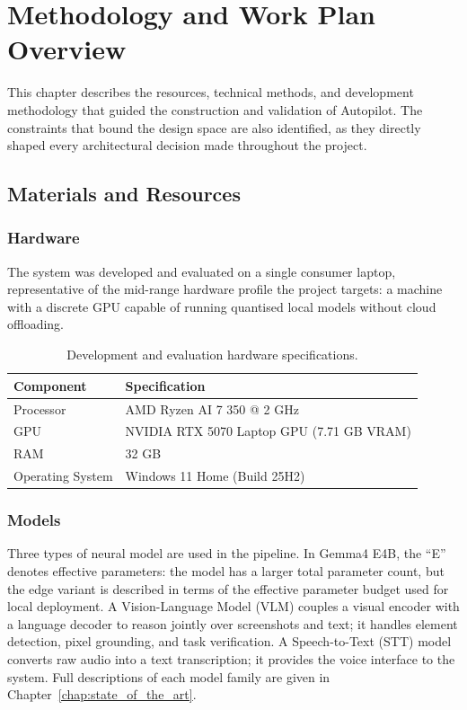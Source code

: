 ﻿\chapter{Methodology and Work Plan Overview}
\setcounter{section}{0}

This chapter describes the resources, technical methods, and development methodology that guided the construction and validation of Autopilot. The constraints that bound the design space are also identified, as they directly shaped every architectural decision made throughout the project.

\section{Materials and Resources}
\label{sec:materials_and_resources}

\subsection{Hardware}

The system was developed and evaluated on a single consumer laptop, representative of the mid-range hardware profile the project targets: a machine with a discrete GPU capable of running quantised local models without cloud offloading.

\begin{table}[H]
\centering
\begin{tabularx}{\textwidth}{|l|X|}
\hline
\textbf{Component} & \textbf{Specification} \\
\hline
Processor & AMD Ryzen AI 7 350 @ 2 GHz \\
\hline
GPU & NVIDIA RTX 5070 Laptop GPU (7.71 GB VRAM) \\
\hline
RAM & 32 GB \\
\hline
Operating System & Windows 11 Home (Build 25H2) \\
\hline
\end{tabularx}
\caption{Development and evaluation hardware specifications.}
\label{tab:hardware}
\end{table}

\subsection{Models}

Three types of neural model are used in the pipeline. In Gemma4 E4B, the ``E'' denotes effective parameters: the model has a larger total parameter count, but the edge variant is described in terms of the effective parameter budget used for local deployment. A Vision-Language Model (VLM) couples a visual encoder with a language decoder to reason jointly over screenshots and text; it handles element detection, pixel grounding, and task verification. A Speech-to-Text (STT) model converts raw audio into a text transcription; it provides the voice interface to the system. Full descriptions of each model family are given in Chapter~\ref{chap:state_of_the_art}.

